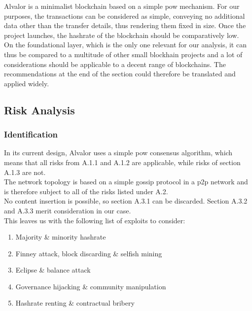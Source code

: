 \documentclass[12pt,a4paper]{article}
\begin{document}
Alvalor is a minimalist \gls{blockchain} based on a simple \acrlong{pow} mechanism. For our purposes, the \glspl{transaction} can be considered as simple, conveying no additional data other than the transfer details, thus rendering them fixed in size. Once the project launches, the \gls{hashrate} of the \gls{blockchain} should be comparatively low.\\

On the foundational layer, which is the only one relevant for our analysis, it can thus be compared to a multitude of other small blockhain projects and a lot of considerations should be applicable to a decent range of \glspl{blockchain}. The recommendations at the end of the section could therefore be translated and applied widely.\\

\subsection{Risk Analysis}

\subsubsection{Identification}

In its current design, Alvalor uses a simple \acrshort{pow} consensus algorithm, which means that all risks from A.1.1 and A.1.2 are applicable, while risks of section A.1.3 are not.\\

The network topology is based on a simple gossip protocol in a \acrlong{p2p} network and is therefore subject to all of the risks listed under A.2.\\

No content insertion is possible, so section A.3.1 can be discarded. Section A.3.2 and A.3.3 merit consideration in our case.\\

This leaves us with the following list of exploits to consider:
\begin{enumerate}
  \item Majority \& minority hashrate
  \item Finney attack, block discarding \& selfish mining
  \item Eclipse \& balance attack
  \item Governance hijacking \& community manipulation
  \item Hashrate renting \& contractual bribery
\end{enumerate}
\end{document}
